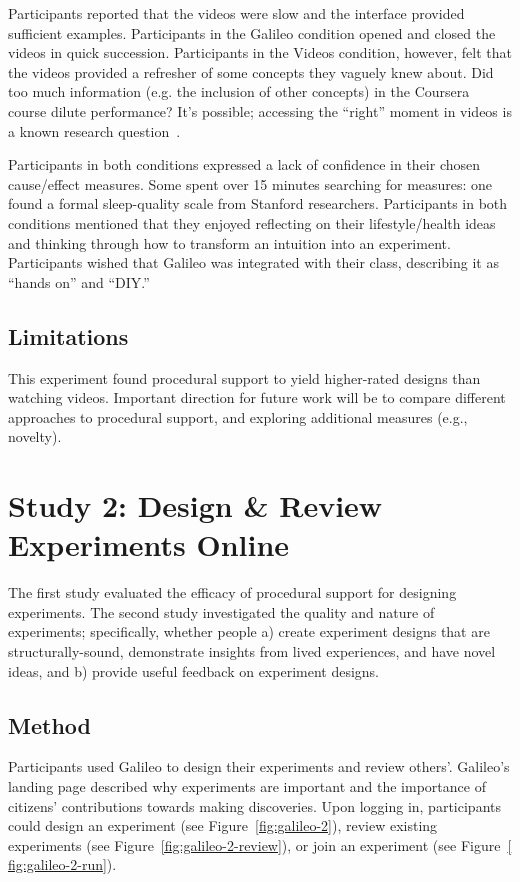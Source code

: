 Participants reported that the videos were slow and the interface provided sufficient examples. Participants in the Galileo condition opened and closed the videos in quick succession. Participants in the Videos condition, however, felt that the videos provided a refresher of some concepts they vaguely knew about. Did too much information (e.g. the inclusion of other concepts) in the Coursera course dilute performance? It's possible; accessing the “right” moment in videos is a known research question~\cite{kim2014crowdsourcing}. 

Participants in both conditions expressed a lack of confidence in their chosen cause/effect measures. Some spent over 15 minutes searching for measures: one found a formal sleep-quality scale from Stanford researchers. Participants in both conditions mentioned that they enjoyed reflecting on their lifestyle/health ideas and thinking through how to transform an intuition into an experiment. Participants wished that Galileo was integrated with their class, describing it as “hands on” and “DIY.” 

\subsection*{Limitations}
This experiment found procedural support to yield higher-rated designs than watching videos. Important direction for future work will be to compare different approaches to procedural support, and exploring additional measures (e.g., novelty). 

\section{Study 2: Design \& Review Experiments Online}
The first study evaluated the efficacy of procedural support for designing experiments. The second study investigated the quality and nature of experiments; specifically, whether people a) create experiment designs that are structurally-sound, demonstrate insights from lived experiences, and have novel ideas, and b) provide useful feedback on experiment designs. 

\subsection*{Method}
Participants used Galileo to design their experiments and review others'. Galileo's landing page described why experiments are important and the importance of citizens' contributions towards making discoveries. Upon logging in, participants could design an experiment (see Figure~\ref{fig:galileo-2}), review existing experiments (see Figure~\ref{fig:galileo-2-review}), or join an experiment (see Figure~\ref{ fig:galileo-2-run}). 

